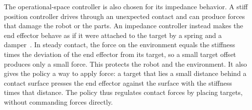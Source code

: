 The operational-space controller is also chosen for its impedance behavior. A stiff position controller drives through an unexpected contact and can produce forces that damage the robot or the parts. An impedance controller instead makes the end effector behave as if it were attached to the target by a spring and a damper~\cite{Villani2016}. In steady contact, the force on the environment equals the stiffness times the deviation of the end effector from its target, so a small target offset produces only a small force. This protects the robot and the environment. It also gives the policy a way to apply force: a target that lies a small distance behind a contact surface presses the end effector against the surface with the stiffness times that distance. The policy thus regulates contact forces by placing targets, without commanding forces directly.

